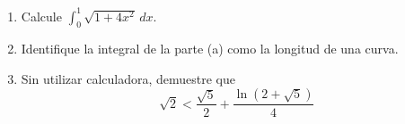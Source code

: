 \item 
    \begin{enumerate}
        \item[(a)] Calcule $\displaystyle\int_{0}^{1} \sqrt{1 + 4x^2} \, dx$.
        \item[(b)] Identifique la integral de la parte (a) como la longitud de una curva.
        \item[(c)] Sin utilizar calculadora, demuestre que
        \[ \sqrt{2} < \frac{\sqrt{5}}{2} + \frac{\ln(2 + \sqrt{5})}{4} \]
    \end{enumerate}
